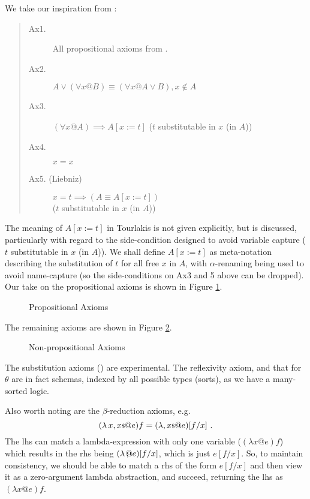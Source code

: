 We take our inspiration from \cite{journals/logcom/Tourlakis01}:
\begin{quote}
\begin{description}
  \item[Ax1.] All propositional axioms from \cite{gries.93}.
  \item[Ax2.] $A \lor (\forall x @ B) \equiv (\forall x @ A \lor B), x \notin A$
  \item[Ax3.] $(\forall x @ A) \implies A[x:=t]$ ($t$ substitutable in $x$ (in $A$))
  \item[Ax4.] $x = x$
  \item[Ax5. (Liebniz)] $x = t \implies (A \equiv A[x:=t])$
     \\($t$ substitutable in $x$ (in $A$))
\end{description}
\end{quote}
The meaning of $A[x:=t]$ in Tourlakis is not given
explicitly, but is discussed, particularly with regard
to the  side-condition designed to avoid variable capture ($t$ substitutable in $x$ (in $A$)).
We shall define $A[x:=t]$
as meta-notation describing the substitution
of $t$ for all free $x$ in $A$, with $\alpha$-renaming being
used to avoid name-capture (so the side-conditions on Ax3 and 5 above can be dropped).
Our take on the propositional axioms is shown in Figure \ref{fig:UTP2:prop-axioms}.
\begin{figure}
\begin{center}
  \boxedm{$$
  \AXPROP
  $$}
\end{center}
  \caption{ Propositional Axioms}
  \label{fig:UTP2:prop-axioms}
\end{figure}
The remaining axioms are shown in Figure \ref{fig:UTP2:non-prop-axioms}.
\begin{figure}
\begin{center}
\boxedm{$$
  \AXNONPROP
$$}
\end{center}
  \caption{ Non-propositional Axioms}
  \label{fig:UTP2:non-prop-axioms}
\end{figure}
The substitution axioms () are experimental.
The reflexivity axiom, and that for $\theta$ are in fact schemas, indexed by all possible
types (sorts), as we have a many-sorted logic.

Also worth noting are the $\beta$-reduction axioms, e.g.
$$\AXObetaRed~.$$
The lhs can match a lambda-expression with only one variable ($(\lambda x @ e)f$)
which results in the rhs being $(\lambda \qsep @ e)[f/x]$,
which is just $e[f/x]$.
So, to maintain consistency, we should be able to match a rhs
of the form $e[f/x]$ and then view it as a zero-argument lambda abstraction,
and succeed, returning the lhs as $(\lambda x @ e)f$.




